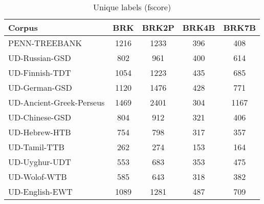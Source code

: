 \begin{table}[h]
    \centering
    \caption{Unique labels (fscore)}
    \label{tab:unique}
    \begin{tabular}{lcccc}
        \hline
        Corpus                          &  BRK & BRK2P & BRK4B & BRK7B \\
        \hline
        PENN-TREEBANK                   & 1216 &  1233 &   396 &   408 \\
        UD-Russian-GSD                  &  802 &   961 &   400 &   614 \\
        UD-Finnish-TDT                  & 1054 &  1223 &   435 &   685 \\
        UD-German-GSD                   & 1120 &  1476 &   428 &   771 \\
        UD-Ancient-Greek-Perseus        & 1469 &  2401 &   304 &  1167 \\
        UD-Chinese-GSD                  &  804 &   912 &   321 &   406 \\
        UD-Hebrew-HTB                   &  754 &   798 &   317 &   357 \\
        UD-Tamil-TTB                    &  262 &   274 &   153 &   164 \\
        UD-Uyghur-UDT                   &  553 &   683 &   353 &   475 \\
        UD-Wolof-WTB                    &  585 &   643 &   318 &   382 \\
        UD-English-EWT                  & 1089 &  1281 &   487 &   709 \\
        \hline
    \end{tabular}
\end{table}


